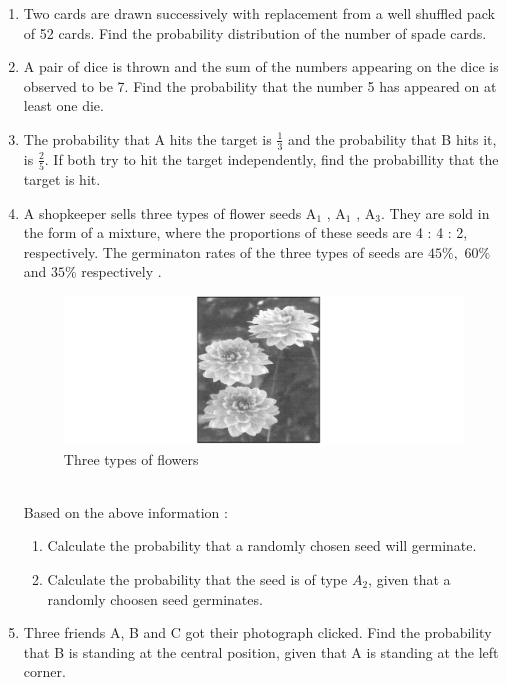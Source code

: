 \begin{enumerate}[label=\thesection.\arabic*.,ref=\thesection.\theenumi]
\begin{enumerate}
\end{enumerate}
\item Two cards are drawn successively with replacement from a well shuffled pack of 52 cards. Find the probability distribution of the number of spade cards.
\item A pair of dice is thrown and the sum of the numbers appearing on the dice is observed to be 7. Find the probability that the number 5 has appeared on at least one die.
\item The probability that A hits the target is $\frac{1}{3}$ and the probability that B hits it, is $\frac{2}{5}.$ If both try to hit the target independently, find the probabillity that the target is hit. 
\item A shopkeeper sells three types of flower seeds A$_1$ , A$_1$ , A$_3$. They are sold in the form of a mixture, where the proportions of these seeds are  4 : 4 : 2, respectively. The germinaton rates of the three types of seeds are $45\%,$ $60\%$ and $35\%$ respectively .
\begin{figure}[!ht]
\centering                                  \includegraphics[width=\columnwidth]{figs/flowers}                                     
\caption{Three types of flowers}            
\label{fig:2022/probability/flowers11}                       
\end{figure}
\\ Based on  the above information :
\begin{enumerate}
\item  Calculate the probability that a randomly chosen seed will germinate.
\item  Calculate the probability  that the seed is of type $A_2$, given that a randomly choosen seed germinates.
\end{enumerate}
\item Three friends A, B and C got their photograph clicked. Find the probability that B is standing at the central position, given that A is standing at the left corner.

\end{enumerate}

